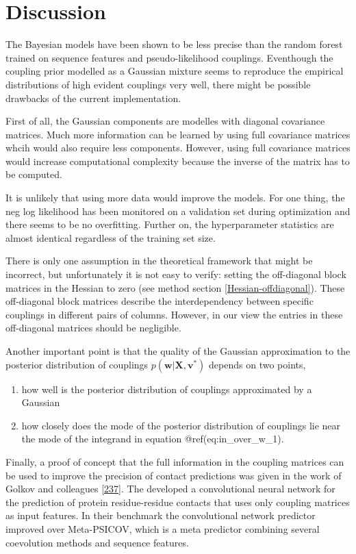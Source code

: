 \documentclass[11pt,a4paper,twoside]{book}
\providecommand{\tightlist}{%
  \setlength{\itemsep}{0pt}\setlength{\parskip}{0pt}}
\renewcommand{\v}{\mathbf{v}}
\newcommand{\w}{\mathbf{w}}
\newcommand{\X}{\mathbf{X}}
\theoremstyle{definition}
\theoremstyle{definition}
\theoremstyle{remark}
\begin{document}
\section{Discussion}\label{discussion-3}

The Bayesian models have been shown to be less precise than the random
forest trained on sequence features and pseudo-likelihood couplings.
Eventhough the coupling prior modelled as a Gaussian mixture seems to
reproduce the empirical distributions of high evident couplings very
well, there might be possible drawbacks of the current implementation.

First of all, the Gaussian components are modelles with diagonal
covariance matrices. Much more information can be learned by using full
covariance matrices whcih would also require less components. However,
using full covariance matrices would increase computational complexity
because the inverse of the matrix has to be computed.

It is unlikely that using more data would improve the models. For one
thing, the neg log likelihood has been monitored on a validation set
during optimization and there seems to be no overfitting. Further on,
the hyperparameter statistics are almost identical regardless of the
training set size.

There is only one assumption in the theoretical framework that might be
incorrect, but unfortunately it is not easy to verify: setting the
off-diagonal block matrices in the Hessian to zero (see method section
\ref{Hessian-offdiagonal}). These off-diagonal block matrices describe
the interdependency between specific couplings in different pairs of
columns. However, in our view the entries in these off-diagonal matrices
should be negligible.

Another important point is that the quality of the Gaussian
approximation to the posterior distribution of couplings
\(p(\w | \X , \v^*)\) depends on two points,

\begin{enumerate}
\def\labelenumi{\arabic{enumi}.}
\tightlist
\item
  how well is the posterior distribution of couplings approximated by a
  Gaussian
\item
  how closely does the mode of the posterior distribution of couplings
  lie near the mode of the integrand in equation
  @ref(eq:in\_over\_w\_1).
\end{enumerate}

Finally, a proof of concept that the full information in the coupling
matrices can be used to improve the precision of contact predictions was
given in the work of Golkov and colleagues
{[}\protect\hyperlink{ref-Golkov2016a}{237}{]}. The developed a
convolutional neural network for the prediction of protein
residue-residue contacts that uses only coupling matrices as input
features. In their benchmark the convolutional network predictor
improved over Meta-PSICOV, which is a meta predictor combining several
coevolution methods and sequence features.
\end{document}
